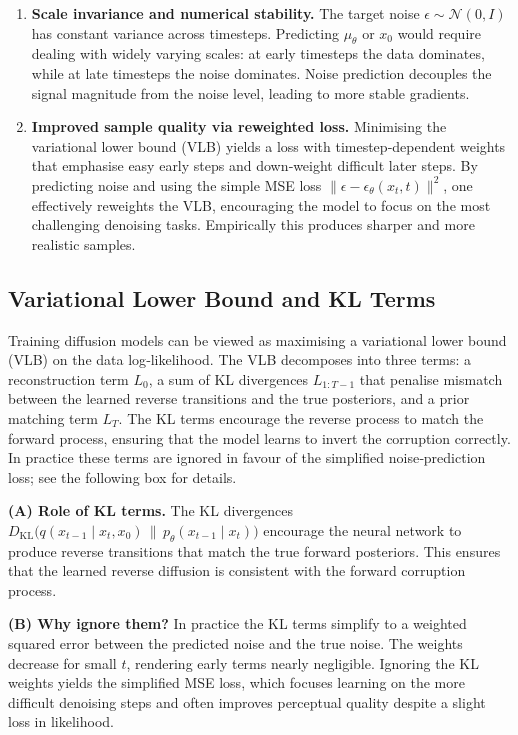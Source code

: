 \begin{solutionbox}
  \begin{enumerate}[label=\arabic*., leftmargin=2em]
    \item \textbf{Scale invariance and numerical stability.}  The
      target noise $\epsilon \sim \mathcal{N}(0,I)$ has constant
      variance across timesteps.  Predicting $\mu_\theta$ or $x_0$ would
      require dealing with widely varying scales: at early timesteps
      the data dominates, while at late timesteps the noise dominates.
      Noise prediction decouples the signal magnitude from the noise
      level, leading to more stable gradients.
    \item \textbf{Improved sample quality via reweighted loss.}
      Minimising the variational lower bound (VLB) yields a loss with
      timestep‑dependent weights that emphasise easy early steps and
      down‑weight difficult later steps.  By predicting noise and using
      the simple MSE loss $\|\epsilon - \epsilon_\theta(x_t,t)\|^2$,
      one effectively reweights the VLB, encouraging the model to
      focus on the most challenging denoising tasks.  Empirically
      this produces sharper and more realistic samples.
  \end{enumerate}
\end{solutionbox}

\subsection{Variational Lower Bound and KL Terms}

Training diffusion models can be viewed as maximising a variational
lower bound (VLB) on the data log‑likelihood.  The VLB decomposes
into three terms: a reconstruction term $L_0$, a sum of KL
divergences $L_{1:T-1}$ that penalise mismatch between the learned
reverse transitions and the true posteriors, and a prior matching
term $L_T$.  The KL terms encourage the reverse process to match the
forward process, ensuring that the model learns to invert the
corruption correctly.  In practice these terms are ignored in
favour of the simplified noise‑prediction loss; see the following box
for details.

\begin{solutionbox}
  \textbf{(A) Role of KL terms.}  The KL divergences
  \(D_{\text{KL}}\bigl(q(x_{t-1}\mid x_t, x_0)\,\|\,p_\theta(x_{t-1}\mid x_t)\bigr)\)
  encourage the neural network to produce reverse transitions that
  match the true forward posteriors.  This ensures that the learned
  reverse diffusion is consistent with the forward corruption process.

  \textbf{(B) Why ignore them?}  In practice the KL terms simplify to
  a weighted squared error between the predicted noise and the true
  noise.  The weights decrease for small $t$, rendering early terms
  nearly negligible.  Ignoring the KL weights yields the simplified
  MSE loss, which focuses learning on the more difficult denoising
  steps and often improves perceptual quality despite a slight loss
  in likelihood.
\end{solutionbox}

